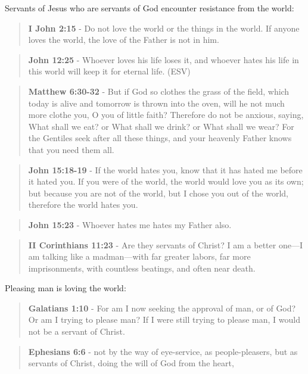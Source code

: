 \documentclass[11pt]{article}
\begin{document}
Servants of Jesus who are servants of God encounter resistance from the world:

\begin{quote}
\textbf{I John 2:15} - Do not love the world or the things in the world. If anyone loves the world, the love of the Father is not in him.
\end{quote}

\begin{quote}
\textbf{John 12:25} -  Whoever loves his life loses it, and whoever hates his life in this world will keep it for eternal life.  (ESV)
\end{quote}

\begin{quote}
\textbf{Matthew 6:30-32} - But if God so clothes the grass of the field, which today is alive and tomorrow is thrown into the oven, will he not much more clothe you, O you of little faith? Therefore do not be anxious, saying, What shall we eat? or What shall we drink? or What shall we wear? For the Gentiles seek after all these things, and your heavenly Father knows that you need them all.
\end{quote}

\begin{quote}
\textbf{John 15:18-19} - If the world hates you, know that it has hated me before it hated you. If you were of the world, the world would love you as its own; but because you are not of the world, but I chose you out of the world, therefore the world hates you.
\end{quote}

\begin{quote}
\textbf{John 15:23} - Whoever hates me hates my Father also.
\end{quote}

\begin{quote}
\textbf{II Corinthians 11:23} - Are they servants of Christ? I am a better one—I am talking like a madman—with far greater labors, far more imprisonments, with countless beatings, and often near death.
\end{quote}

Pleasing man is loving the world:

\begin{quote}
\textbf{Galatians 1:10} - For am I now seeking the approval of man, or of God? Or am I trying to please man? If I were still trying to please man, I would not be a servant of Christ.
\end{quote}

\begin{quote}
\textbf{Ephesians 6:6} - not by the way of eye-service, as people-pleasers, but as servants of Christ, doing the will of God from the heart,
\end{quote}
\end{document}
